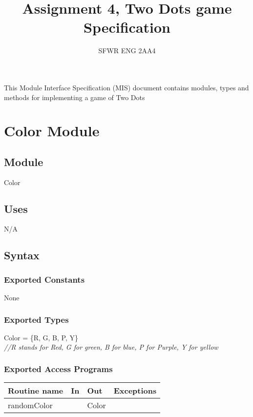\documentclass[12pt]{article}
\title{Assignment 4, Two Dots game Specification}
\author{SFWR ENG 2AA4}
\begin{document}
\maketitle
This Module Interface Specification (MIS) document contains modules, types and
methods for implementing a game of Two Dots

\newpage

\section* {Color Module}

\subsection*{Module}

Color

\subsection* {Uses}

N/A

\subsection* {Syntax}

\subsubsection* {Exported Constants}

None

\subsubsection* {Exported Types}

Color = \{R, G, B, P, Y\}\\

\noindent \textit{//R stands for Red, G for green, B for blue, P for
  Purple, Y for yellow}

\subsubsection* {Exported Access Programs}

\begin{tabular}{| l | l | l | p{5cm} |}
\hline
\textbf{Routine name} & \textbf{In} & \textbf{Out} & \textbf{Exceptions}\\
\hline
randomColor &  & Color & ~\\
\hline
\end{tabular}
\end{document}
